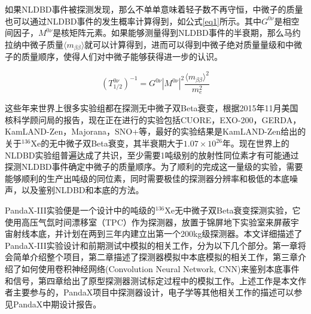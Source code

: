 如果NLDBD事件被探测发现，那么不单单意味着轻子数不再守恒，中微子的质量也可以通过NLDBD事件的发生概率计算得到，如公式\ref{eq1}所示\supercite{avignone2008double}。其中$G^{0\nu}$是相空间因子，$M^{0\nu}$是核矩阵元素。如果能够测量得到NLDBD事件的半衰期，那么马约拉纳中微子质量$\langle m_{\beta\beta}\rangle$就可以计算得到，进而可以得到中微子绝对质量量级和中微子的质量顺序，使得人们对中微子能够获得进一步的认识。

\begin{equation}
    (T_{1/2}^{0\nu})^{-1}=G^{0\nu}|M^{0\nu}|^2\frac{\langle m_{\beta\beta}\rangle ^2}{m_e^2}
    \label{eq1}
\end{equation}

这些年来世界上很多实验组都在探测无中微子双Beta衰变，根据2015年11月美国核科学顾问局的报告\supercite{NLDBD_NSAC}，现在正在进行的实验包括CUORE\supercite{Artusa:2014lgv}，EXO-200\supercite{Albert:2014awa}，GERDA\supercite{Agostini:2016iid}，KamLAND-Zen\supercite{KamLAND-Zen:2016pfg}，Majorana\supercite{Abgrall:2013rze}，SNO+\supercite{Andringa:2015tza}等，最好的实验结果是KamLAND-Zen给出的关于$^{136}$Xe的无中微子双Beta衰变，其半衰期大于$1.07\times10^{26}$年。现在世界上的NLDBD实验组普遍达成了共识，至少需要1吨级别的放射性同位素才有可能通过探测NLDBD事件确定中微子的质量顺序。为了顺利的完成这一量级的实验，需要能够顺利的生产出吨级的同位素，同时需要极佳的探测器分辨率和极低的本底噪声，以及鉴别NLDBD和本底的方法。

PandaX-III实验便是一个设计中的吨级的$^{136}$Xe无中微子双Beta衰变探测实验，它使用高压气氙时间漂移室（TPC）作为探测器，放置于锦屏地下实验室来屏蔽宇宙射线本底，并计划在两到三年内建立出第一个200kg级探测器。本文详细描述了PandaX-III实验设计和前期测试中模拟的相关工作，分为以下几个部分。第一章将会简单介绍整个项目，第二章描述了探测器模拟中本底模拟的相关工作，第三章介绍了如何使用卷积神经网络(Convolution Neural Network, CNN)来鉴别本底事件和信号，第四章给出了原型探测器测试标定过程中的模拟工作。上述工作是本文作者主要参与的，PandaX项目中探测器设计，电子学等其他相关工作的描述可以参见PandaX中期设计报告\supercite{chen2017pandax}。

